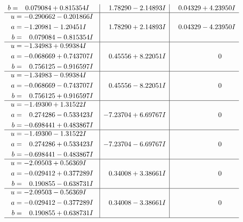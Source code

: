\documentclass[1p]{elsarticle_modified}
\theoremstyle{definition}
\begin{document}
$$\begin{array}{c|c|c}
\begin{aligned}
b &= \phantom{-}0.079084 + 0.815354 I\end{aligned}
 & \phantom{-}1.78290 - 2.14893 I & \phantom{-}0.04329 + 4.23950 I \\ \hline\begin{aligned}
u &= -0.290662 - 0.201866 I \\
a &= -1.20981 - 1.20451 I \\
b &= \phantom{-}0.079084 - 0.815354 I\end{aligned}
 & \phantom{-}1.78290 + 2.14893 I & \phantom{-}0.04329 - 4.23950 I \\ \hline\begin{aligned}
u &= -1.34983 + 0.99384 I \\
a &= -0.068669 + 0.743707 I \\
b &= \phantom{-}0.756125 - 0.916597 I\end{aligned}
 & \phantom{-}0.45556 + 8.22051 I & \phantom{-0.000000 } 0 \\ \hline\begin{aligned}
u &= -1.34983 - 0.99384 I \\
a &= -0.068669 - 0.743707 I \\
b &= \phantom{-}0.756125 + 0.916597 I\end{aligned}
 & \phantom{-}0.45556 - 8.22051 I & \phantom{-0.000000 } 0 \\ \hline\begin{aligned}
u &= -1.49300 + 1.31522 I \\
a &= \phantom{-}0.274286 - 0.533423 I \\
b &= -0.698441 + 0.483867 I\end{aligned}
 & -7.23704 + 6.69767 I & \phantom{-0.000000 } 0 \\ \hline\begin{aligned}
u &= -1.49300 - 1.31522 I \\
a &= \phantom{-}0.274286 + 0.533423 I \\
b &= -0.698441 - 0.483867 I\end{aligned}
 & -7.23704 - 6.69767 I & \phantom{-0.000000 } 0 \\ \hline\begin{aligned}
u &= -2.09503 + 0.56369 I \\
a &= -0.029412 + 0.377289 I \\
b &= \phantom{-}0.190855 - 0.638731 I\end{aligned}
 & \phantom{-}0.34008 + 3.38661 I & \phantom{-0.000000 } 0 \\ \hline\begin{aligned}
u &= -2.09503 - 0.56369 I \\
a &= -0.029412 - 0.377289 I \\
b &= \phantom{-}0.190855 + 0.638731 I\end{aligned}
 & \phantom{-}0.34008 - 3.38661 I & \phantom{-0.000000 } 0\\
 \hline 
 \end{array}$$\newpage\newpage\renewcommand{\arraystretch}{1}
\end{document}
